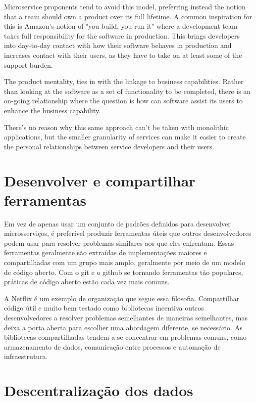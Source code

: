 Microservice proponents tend to avoid this model, preferring instead the notion that a team should own a product over its full lifetime. A common inspiration for this is Amazon's notion of "you build, you run it" where a development team takes full responsibility for the software in production. This brings developers into day-to-day contact with how their software behaves in production and increases contact with their users, as they have to take on at least some of the support burden.

The product mentality, ties in with the linkage to business capabilities. Rather than looking at the software as a set of functionality to be completed, there is an on-going relationship where the question is how can software assist its users to enhance the business capability.

There's no reason why this same approach can't be taken with monolithic applications, but the smaller granularity of services can make it easier to create the personal relationships between service developers and their users. \cite{MartinFowlerMicroservices}

\section{Desenvolver e compartilhar ferramentas}
Em vez de apenas usar um conjunto de padrões definidos para desenvolver microsserviços, é preferível produzir ferramentas úteis que outros desenvolvedores podem usar para resolver problemas similares aos que eles enfrentam. Essas ferramentas geralmente são extraídas de implementações maiores e compartilhadas com um grupo mais amplo, geralmente por meio de um modelo de código aberto. Com o git e o github se tornando ferramentas tão populares, práticas de código aberto estão cada vez mais comuns. \cite{MartinFowlerMicroservices}

A Netflix é um exemplo de organização que segue essa filosofia. Compartilhar código útil e muito bem testado como bibliotecas incentiva outros desenvolvedores a resolver problemas semelhantes de maneiras semelhantes, mas deixa a porta aberta para escolher uma abordagem diferente, se necessário. As bibliotecas compartilhadas tendem a se concentrar em problemas comuns, como armazenamento de dados, comunicação entre processos e automação de infraestrutura. \cite{MartinFowlerMicroservices}

\section{Descentralização dos dados}

